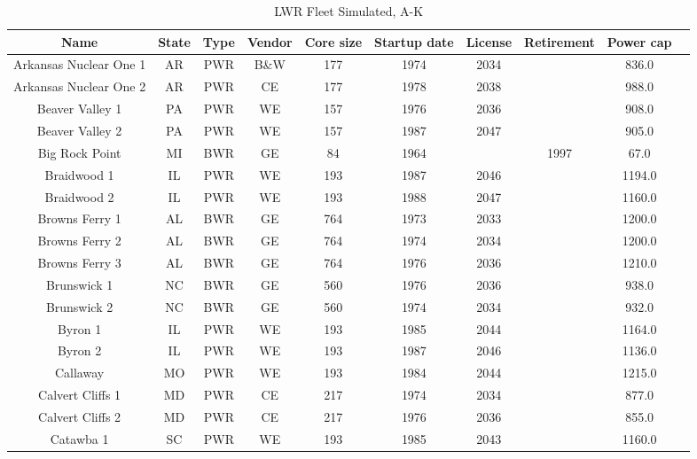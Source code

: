 \begin{table}[!ht]
    \centering
    \caption{LWR Fleet Simulated, A-K}
    \label{tab:lwr_fleet_1}
    \begin{tabular}{c c c c c c c c c c}
    \hline
    \textbf{Name} & \textbf{State} & \textbf{Type} & \textbf{Vendor} & \textbf{Core size} & \textbf{Startup date} & \textbf{License} & \textbf{Retirement} & \textbf{Power cap} \\
    \hline
    Arkansas Nuclear One 1&AR & PWR & B\&W & 177 & 1974 & 2034 &      & 836.0 \\
    Arkansas Nuclear One 2&AR & PWR & CE   & 177 & 1978 & 2038 &      & 988.0 \\
    Beaver Valley 1       &PA & PWR & WE   & 157 & 1976 & 2036 &      & 908.0 \\
    Beaver Valley 2       &PA & PWR & WE   & 157 & 1987 & 2047 &      & 905.0 \\
    Big Rock Point        &MI & BWR & GE   & 84  & 1964 &      & 1997 & 67.0  \\
    Braidwood 1           &IL & PWR & WE   & 193 & 1987 & 2046 &      & 1194.0\\
    Braidwood 2           &IL & PWR & WE   & 193 & 1988 & 2047 &      & 1160.0\\
    Browns Ferry 1        &AL & BWR & GE   & 764 & 1973 & 2033 &      & 1200.0\\
    Browns Ferry 2        &AL & BWR & GE   & 764 & 1974 & 2034 &      & 1200.0\\
    Browns Ferry 3        &AL & BWR & GE   & 764 & 1976 & 2036 &      & 1210.0\\
    Brunswick 1           &NC & BWR & GE   & 560 & 1976 & 2036 &      & 938.0 \\
    Brunswick 2           &NC & BWR & GE   & 560 & 1974 & 2034 &      & 932.0 \\
    Byron 1               &IL & PWR & WE   & 193 & 1985 & 2044 &      & 1164.0\\
    Byron 2               &IL & PWR & WE   & 193 & 1987 & 2046 &      & 1136.0\\
    Callaway              &MO & PWR & WE   & 193 & 1984 & 2044 &      & 1215.0\\
    Calvert Cliffs 1      &MD & PWR & CE   & 217 & 1974 & 2034 &      & 877.0 \\
    Calvert Cliffs 2      &MD & PWR & CE   & 217 & 1976 & 2036 &      & 855.0 \\
    Catawba 1             &SC & PWR & WE   & 193 & 1985 & 2043 &      & 1160.0\\

\end{tabular}
\end{table}
